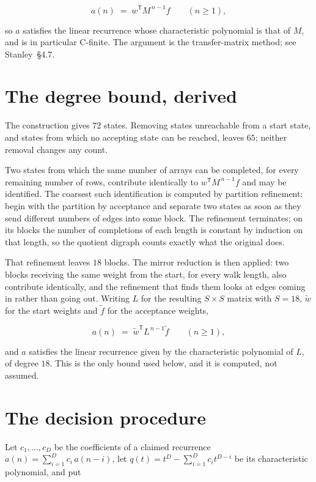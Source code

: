 \documentclass[11pt]{article}
\theoremstyle{definition}
\begin{document}
\[a(n) \;=\; w^{\mathsf T} M^{\,n-1} f \qquad (n \ge 1),\]

so $a$ satisfies the linear recurrence whose characteristic polynomial is that of $M$, and is in particular C-finite. The argument is the transfer-matrix method; see Stanley~\S4.7.

\section{The degree bound, derived}

The construction gives $72$ states. Removing states unreachable from a start state, and states from which no accepting state can be reached, leaves $65$; neither removal changes any count.

Two states from which the same number of arrays can be completed, for every remaining number of rows, contribute identically to $w^{\mathsf T}M^{\,n-1}f$ and may be identified. The coarsest such identification is computed by partition refinement: begin with the partition by acceptance and separate two states as soon as they send different numbers of edges into some block. The refinement terminates; on its blocks the number of completions of each length is constant by induction on that length, so the quotient digraph counts exactly what the original does.

That refinement leaves $18$ blocks. The mirror reduction is then applied: two blocks receiving the same weight from the start, for every walk length, also contribute identically, and the refinement that finds them looks at edges coming in rather than going out. Writing $L$ for the resulting $S \times S$ matrix with $S = 18$, $\tilde w$ for the start weights and $\tilde f$ for the acceptance weights,

\[a(n) \;=\; \tilde w^{\mathsf T} L^{\,n-1} \tilde f \qquad (n \ge 1),\]

and $a$ satisfies the linear recurrence given by the characteristic polynomial of $L$, of degree $18$. This is the only bound used below, and it is computed, not assumed.

\section{The decision procedure}

Let $c_1,\dots,c_D$ be the coefficients of a claimed recurrence $a(n) = \sum_{i=1}^{D} c_i\,a(n-i)$, let $q(t) = t^{D} - \sum_{i=1}^{D} c_i t^{D-i}$ be its characteristic polynomial, and put
\end{document}
